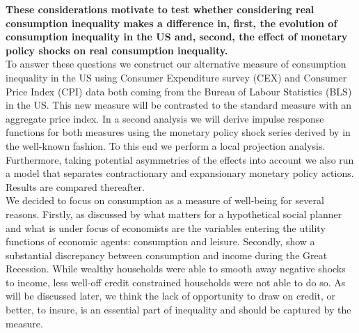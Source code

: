 \documentclass{article}
\begin{document}
\textbf{These considerations motivate to test whether considering real consumption inequality makes a difference in, first, the evolution of consumption inequality in the US and, second, the effect of monetary policy shocks on real consumption inequality. }
\\
To answer these questions we construct our alternative measure of consumption inequality in the US using Consumer Expenditure survey (CEX) and Consumer Price Index (CPI) data both coming from the Bureau of Labour Statistics (BLS) in the US. This new measure will be contrasted to the standard measure with an aggregate price index. In a second analysis we will  derive impulse response functions for both measures using the monetary policy shock series derived by \cite{Coibion2017InnocentInequality} in the well-known \cite{Romer2004AImplications} fashion. To this end we perform a local projection analysis. Furthermore, taking potential asymmetries of the effects into account we also run a model that separates contractionary and expansionary monetary policy actions. Results are compared thereafter.  
\\
 We decided to focus on consumption as a measure of well-being for several reasons. Firstly, as discussed by \cite{AttanasioO.2016ConsumptionInequality} what matters for a hypothetical social planner and what is under focus of economists are the variables entering the utility functions of economic agents: consumption and leisure.  Secondly, \cite{Meyer2013ConsumptionRecession} show a substantial discrepancy between consumption and income during the Great Recession. While wealthy households were able to smooth away negative shocks to income, less well-off credit constrained households were not able to do so.  As will be discussed later, we think the lack of opportunity to draw on credit, or better, to insure, is an essential part of inequality and should be captured by the measure. 
\end{document}

